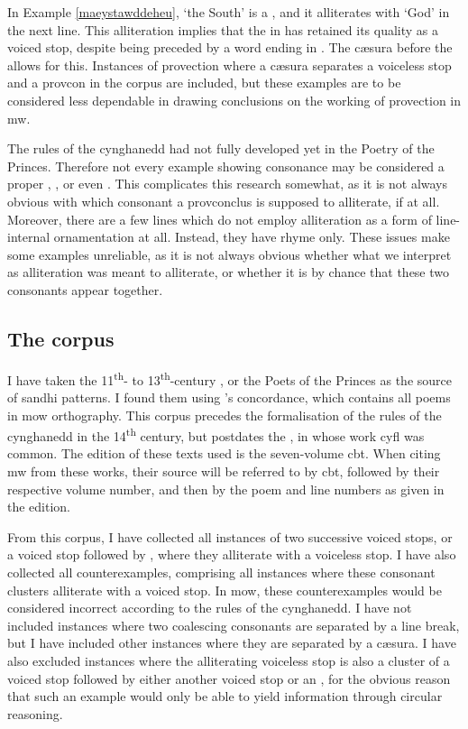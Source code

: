 In Example \ref{maeystawddeheu},  `the South' is a , and it alliterates with  `God' in the next line. This alliteration implies that the  in  has retained its quality as a voiced stop, despite being preceded by a word ending in . The c\ae sura before the  allows for this. Instances of provection where a c\ae sura separates a voiceless stop and a \gls{provcon} in the corpus are included, but these examples are to be considered less dependable in drawing conclusions on the working of provection in \gls{mw}.

The rules of the cynghanedd had not fully developed yet in the Poetry of the Princes. Therefore not every example showing consonance may be considered a proper , ,  or even . This complicates this research somewhat, as it is not always obvious with which consonant a \gls{provconclus} is supposed to alliterate, if at all. Moreover, there are a few lines which do not employ alliteration as a form of line-internal ornamentation at all. Instead, they have rhyme only. These issues make some examples unreliable, as it is not always obvious whether what we interpret as alliteration was meant to alliterate, or whether it is by chance that these two consonants appear together.

\subsection{The corpus}
I have taken the 11\textsuperscript{th}- to 13\textsuperscript{th}-century , or the Poets of the Princes as the source of sandhi patterns. I found them using \textcite{parry_owen_concordans_????}'s concordance, which contains all poems in \gls{mow} orthography. This corpus precedes the formalisation of the rules of the cynghanedd in the 14\textsuperscript{th} century, but postdates the , in whose work \gls{cyfl} was common. The edition of these texts used is the seven-volume \gls{cbt}. When citing \gls{mw} from these works, their source will be referred to by \acrshort{cbt}, followed by their respective volume number, and then by the poem and line numbers as given in the edition.  

From this corpus, I have collected all instances of two successive voiced stops, or a voiced stop followed by , where they alliterate with a voiceless stop. I have also collected all counterexamples, comprising all instances where these consonant clusters alliterate with a voiced stop. In \gls{mow}, these counterexamples would be considered incorrect according to the rules of the cynghanedd. I have not included instances where two coalescing consonants are separated by a line break, but I have included other instances where they are separated by a c\ae sura. I have also excluded instances where the alliterating voiceless stop is also a cluster of a voiced stop followed by either another voiced stop or an , for the obvious reason that such an example would only be able to yield information through circular reasoning. 

